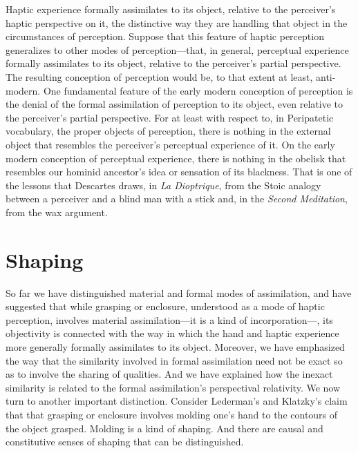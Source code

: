 Haptic experience formally assimilates to its object, relative to the perceiver's haptic perspective on it, the distinctive way they are handling that object in the circumstances of perception. Suppose that this feature of haptic perception generalizes to other modes of perception---that, in general, perceptual experience formally assimilates to its object, relative to the perceiver's partial perspective. The resulting conception of perception would be, to that extent at least, anti-modern. One fundamental feature of the early modern conception of perception is the denial of the formal assimilation of perception to its object, even relative to the perceiver's partial perspective. For at least with respect to, in Peripatetic vocabulary, the proper objects of perception, there is nothing in the external object that resembles the perceiver's perceptual experience of it. On the early modern conception of perceptual experience, there is nothing in the obelisk that resembles our hominid ancestor's idea or sensation of its blackness. That is one of the lessons that Descartes draws, in \emph{La Dioptrique}, from the Stoic analogy between a perceiver and a blind man with a stick and, in the \emph{Second Meditation}, from the wax argument. 


\section{Shaping} %
\label{sec:shaping}

So far we have distinguished material and formal modes of assimilation, and have suggested that while grasping or enclosure, understood as a mode of haptic perception, involves material assimilation---it is a kind of incorporation---, its objectivity is connected with the way in which the hand and  haptic experience more generally formally assimilates to its object. Moreover, we have emphasized the way that the similarity involved in formal assimilation need not be exact so as to involve the sharing of qualities. And we have explained how the inexact similarity is related to the formal assimilation's perspectival relativity. We now turn to another important distinction. Consider Lederman's and Klatzky's \citeyearpar{Lederman:1987fr} claim that that grasping or enclosure involves molding one's hand to the contours of the object grasped. Molding is a kind of shaping. And there are causal and constitutive senses of shaping that can be distinguished. 

